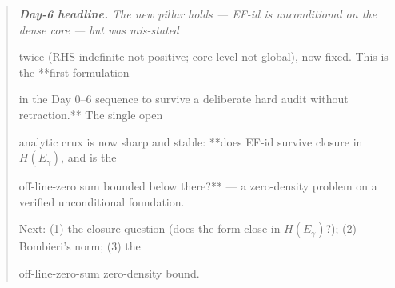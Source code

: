 \documentclass[10pt]{article}
\begin{document}
\begin{quote}\itshape
\textbf{Day-6 headline.} The new pillar holds --- EF-id is unconditional on the dense core --- but was mis-stated\par
twice (RHS indefinite not positive; core-level not global), now fixed. This is the **first formulation\par
in the Day 0--6 sequence to survive a deliberate hard audit without retraction.** The single open\par
analytic crux is now sharp and stable: **does EF-id survive closure in $H(E_\gamma)$, and is the\par
off-line-zero sum bounded below there?** --- a zero-density problem on a verified unconditional foundation.\par
Next: (1) the closure question (does the form close in $H(E_\gamma)$?); (2) Bombieri's norm; (3) the\par
off-line-zero-sum zero-density bound.\par
\end{quote}
\end{document}
